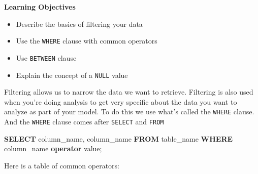 \documentclass[]{book}
\makeatletter
\newenvironment{Shaded}{\begin{snugshade}}{\end{snugshade}}
\newcommand{\KeywordTok}[1]{\textcolor[rgb]{0.13,0.29,0.53}{\textbf{{#1}}}}
\newcommand{\FunctionTok}[1]{\textcolor[rgb]{0.00,0.00,0.00}{{#1}}}
\newcommand{\NormalTok}[1]{{#1}}
\providecommand{\tightlist}{%
  \setlength{\itemsep}{0pt}\setlength{\parskip}{0pt}}
\newenvironment{kframe}{%
\medskip{}
\setlength{\fboxsep}{.8em}
 \def\at@end@of@kframe{}%
 \ifinner\ifhmode%
  \def\at@end@of@kframe{\end{minipage}}%
  \begin{minipage}{\columnwidth}%
 \fi\fi%
 \def\FrameCommand##1{\hskip\@totalleftmargin \hskip-\fboxsep
 \colorbox{shadecolor}{##1}\hskip-\fboxsep
     \hskip-\linewidth \hskip-\@totalleftmargin \hskip\columnwidth}%
 \MakeFramed {\advance\hsize-\width
   \@totalleftmargin\z@ \linewidth\hsize
   \@setminipage}}%
 {\par\unskip\endMakeFramed%
 \at@end@of@kframe}
\renewenvironment{Shaded}{\begin{kframe}}{\end{kframe}}
\theoremstyle{definition}
\theoremstyle{definition}
\theoremstyle{remark}
\makeatother
\begin{document}
\textbf{Learning Objectives}

\begin{itemize}
\tightlist
\item
  Describe the basics of filtering your data
\item
  Use the \texttt{WHERE} clause with common operators
\item
  Use \texttt{BETWEEN} clause
\item
  Explain the concept of a \texttt{NULL} value
\end{itemize}

Filtering allows us to narrow the data we want to retrieve. Filtering is
also used when you're doing analysis to get very specific about the data
you want to analyze as part of your model. To do this we use what's
called the \texttt{WHERE} clause. And the \texttt{WHERE} clause comes
after \texttt{SELECT} and \texttt{FROM}

\begin{Shaded}
\begin{Highlighting}[]
\KeywordTok{SELECT} \NormalTok{column_name, column_name}
\KeywordTok{FROM} \NormalTok{table_name}
\KeywordTok{WHERE} \NormalTok{column_name }\KeywordTok{operator} \FunctionTok{value}\NormalTok{;}
\end{Highlighting}
\end{Shaded}

Here is a table of common operators:
\end{document}
